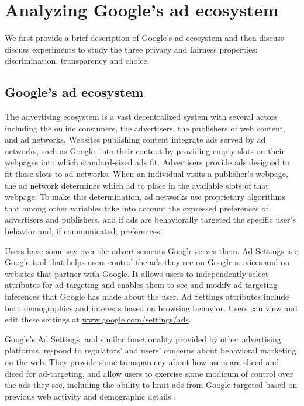 \documentclass[10pt, onecolumn]{report}
\begin{document}

\section{Analyzing Google's ad ecosystem}

We first provide a brief description of Google's ad ecosystem and then discuss
discuss experiments to study the
three privacy and fairness properties: discrimination, transparency and choice.


\subsection{Google's ad ecosystem}

The advertising ecosystem is a vast decentralized system 
with several actors including the online consumers, the advertisers, the publishers 
of web content, and ad networks.  Websites publishing content 
integrate ads served by ad networks, such as Google, into their 
content by providing empty slots on their webpages 
into which standard-sized ads fit.  Advertisers provide ads designed to fit 
these slots to ad networks. When an individual visits a 
publisher's webpage, the ad network determines which ad to place in the 
available slots of that webpage.  To make this determination, ad networks 
use proprietary algorithms that among other variables take into account 
the expressed preferences of advertisers and publishers, and if ads are 
behaviorally targeted the specific user's behavior and, if communicated, preferences.  

Users have some say over the advertisements Google serves them. 
Ad Settings is a Google tool that helps users control the ads they see on 
Google services and on websites that partner with 
Google. It allows users to independently 
select attributes for ad-targeting and enables them to see and modify 
ad-targeting inferences that Google has made about the user. Ad Settings 
attributes include both demographics and interests based on browsing behavior.
Users can view and edit these settings at \url{www.google.com/settings/ads}.

Google's Ad Settings, and similar functionality provided by other 
advertising platforms, respond to regulators' and users' concerns 
about behavioral marketing on the web. %
They provide some transparency about how users are sliced and diced for 
ad-targeting, and allow users to exercise some modicum of control over 
the ads they see, including the ability to limit ads from Google 
targeted based on previous web activity and 
demographic details . 
\end{document}
